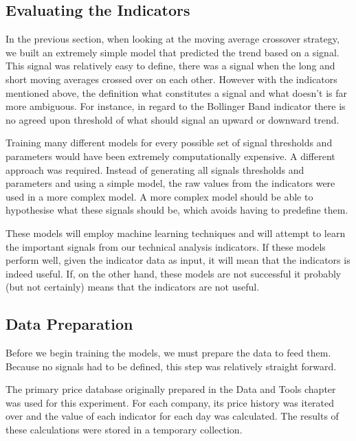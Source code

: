 \documentclass{report}
\begin{document}
\subsection{Evaluating the Indicators}

In the previous section, when looking at the moving average crossover strategy, we built an extremely simple model that predicted the trend based on a signal. This signal was relatively easy to define, there was a signal when the long and short moving averages crossed over on each other. However with the indicators mentioned above, the definition what constitutes a signal and what doesn't is far more ambiguous. For instance, in regard to the Bollinger Band indicator there is no agreed upon threshold of what should signal an upward or downward trend. 

Training many different models for every possible set of signal thresholds and parameters would have been extremely computationally expensive. A different approach was required. Instead of generating all signals thresholds and parameters and using a simple model, the raw values from the indicators were used in a more complex model. A more complex model should be able to hypothesise what these signals should be, which avoids having to predefine them.

These models will employ machine learning techniques and will attempt to learn the important signals from our technical analysis indicators. If these models perform well, given the indicator data as input, it will mean that the indicators is indeed useful. If, on the other hand, these models are not successful it probably (but not certainly) means that the indicators are not useful. 

\subsection{Data Preparation}

Before we begin training the models, we must prepare the data to feed them. Because no signals had to be defined, this step was relatively straight forward. 

The primary price database originally prepared in the Data and Tools chapter was used for this experiment. For each company, its price history was iterated over and the value of each indicator for each day was calculated. The results of these calculations were stored in a temporary collection. 
\end{document}
